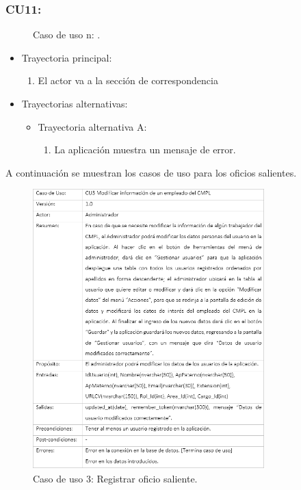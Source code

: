 		\subsubsection{CU11: }
			\begin{figure}[htbp!]
				\centering
					\caption{Caso de uso n: .}
				\label{Tabla}
			\end{figure}
			
			\begin{itemize}
				\item Trayectoria principal:
					\begin{enumerate}
						\item El actor va a la sección de correspondencia 
					\end{enumerate}
				\item Trayectorias alternativas:
					\begin{itemize}
						\item Trayectoria alternativa A:
							\begin{enumerate}
								\item La aplicación muestra un mensaje de error.
							\end{enumerate}
					\end{itemize}
			\end{itemize}

A continuación se muestran los casos de uso para los oficios salientes.
\begin{figure}[htbp!]
		\centering
			\includegraphics[width=0.8\textwidth]{images/CU/CU3}
		\caption{Caso de uso 3: Registrar oficio saliente.}
		\label{Tabla}
	\end{figure}

